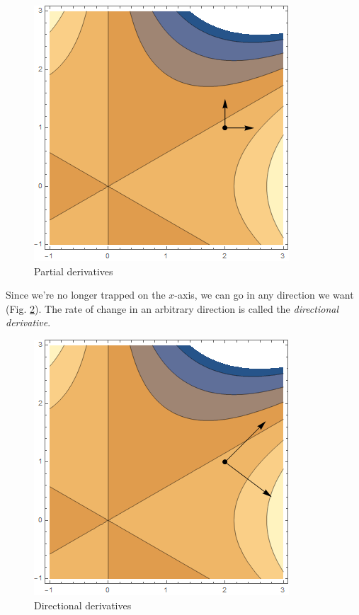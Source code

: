 \documentclass[
]{book}
\theoremstyle{definition}
\theoremstyle{definition}
\theoremstyle{definition}
\theoremstyle{definition}
\theoremstyle{remark}
\begin{document}
\begin{figure}

{\centering \includegraphics[width=0.75\linewidth]{images/dd1} 

}

\caption{Partial derivatives}\label{fig:dd1}
\end{figure}

Since we're no longer trapped on the \(x\)-axis, we can go in any direction we want (Fig. \ref{fig:dd2}). The rate of change in an arbitrary direction is called the \emph{directional derivative}.

\begin{figure}

{\centering \includegraphics[width=0.75\linewidth]{images/dd2} 

}

\caption{Directional derivatives}\label{fig:dd2}
\end{figure}
\end{document}
